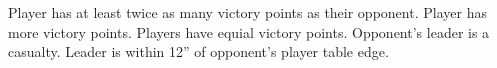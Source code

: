 \begin{columns}
\scoringbox%
{Player has at least twice as many victory points as their opponent.}%
{Player has more victory points.}%
{Players have equial victory points.}%
{Opponent's leader is a casualty.}%
{Leader is within 12'' of opponent's player table edge.}



\end{columns}
